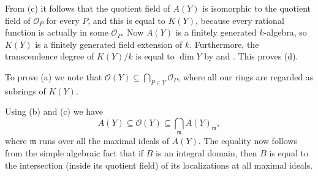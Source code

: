 {From (c) it follows that the quotient field of $A(Y)$ is isomorphic to the quotient field of $\mathcal O_P$ for every $P$, and this is equal to $K(Y)$, because every rational function is actually in some $\mathcal O_P$. Now $A(Y)$ is a finitely generated $k$-algebra, so $K(Y)$ is a finitely generated field extension of $k$. Furthermore, the transcendence degree of $K(Y)/k$ is equal to $\dim Y$ by  and . This proves (d).

To prove (a) we note that $\mathcal O(Y)\subseteq\bigcap_{P\in Y}\mathcal O_P$, where all our rings are regarded as subrings of $K(Y)$.

Using (b) and (c) we have
\[
A(Y)\subseteq\mathcal O(Y)\subseteq\bigcap_{\mathfrak m} A(Y)_{\mathfrak m},
\]
where $\mathfrak m$ runs over all the maximal ideals of $A(Y)$. The equality now follows from the simple algebraic fact that if $B$ is an integral domain, then $B$ is equal to the intersection (inside its quotient field) of its localizations at all maximal ideals.%
}
